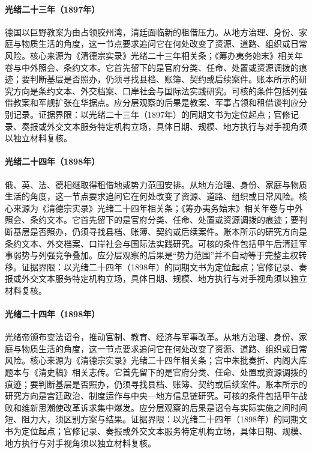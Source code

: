 \hypertarget{social:EQ-1897-JIAOZHOU-BAY-OCCUPATION}{}\paragraph{光绪二十三年（1897年）}德国以巨野教案为由占领胶州湾，清廷面临新的租借压力。从地方治理、身份、家庭与物质生活的角度，这一节点要求追问它在何处改变了资源、道路、组织或日常风险。核心来源为《清德宗实录》光绪二十三年相关条；《筹办夷务始末》相关年卷与中外照会、条约文本。它首先留下的是官府分类、任命、处置或资源调拨的痕迹；要判断基层是否照办，仍须寻找县档、账簿、契约或后续案件。账本所示的研究方向是条约文本、外交档案、口岸社会与国际法实践研究。可核的条件包括列强借教案和军舰扩张在华据点。应分层观察的后果是教案、军事占领和租借谈判应分别记录。证据界限：以光绪二十三年（1897年）的同期文书为定位起点；官修记录、奏报或外交文本服务特定机构立场，具体日期、规模、地方执行与对手视角须以独立材料复核。
\hypertarget{social:EQ-1898-LEASED-TERRITORIES}{}\paragraph{光绪二十四年（1898年）}俄、英、法、德相继取得租借地或势力范围安排。从地方治理、身份、家庭与物质生活的角度，这一节点要求追问它在何处改变了资源、道路、组织或日常风险。核心来源为《清德宗实录》光绪二十四年相关条；《筹办夷务始末》相关年卷与中外照会、条约文本。它首先留下的是官府分类、任命、处置或资源调拨的痕迹；要判断基层是否照办，仍须寻找县档、账簿、契约或后续案件。账本所示的研究方向是条约文本、外交档案、口岸社会与国际法实践研究。可核的条件包括甲午后清廷军事弱势与列强竞争叠加。应分层观察的后果是“势力范围”并不自动等于完整主权转移。证据界限：以光绪二十四年（1898年）的同期文书为定位起点；官修记录、奏报或外交文本服务特定机构立场，具体日期、规模、地方执行与对手视角须以独立材料复核。
\hypertarget{social:EQ-1898-HUNDRED-DAYS-REFORM}{}\paragraph{光绪二十四年（1898年）}光绪帝颁布变法诏令，推动官制、教育、经济与军事改革。从地方治理、身份、家庭与物质生活的角度，这一节点要求追问它在何处改变了资源、道路、组织或日常风险。核心来源为《清德宗实录》光绪二十四年相关条；宫中朱批奏折、内阁大库题本与《清史稿》相关志传。它首先留下的是官府分类、任命、处置或资源调拨的痕迹；要判断基层是否照办，仍须寻找县档、账簿、契约或后续案件。账本所示的研究方向是宫廷政治、制度运作与中央—地方信息链研究。可核的条件包括甲午战败和维新思潮使改革诉求集中爆发。应分层观察的后果是诏令与实际实施之间时间短、阻力大，须区别方案与结果。证据界限：以光绪二十四年（1898年）的同期文书为定位起点；官修记录、奏报或外交文本服务特定机构立场，具体日期、规模、地方执行与对手视角须以独立材料复核。
